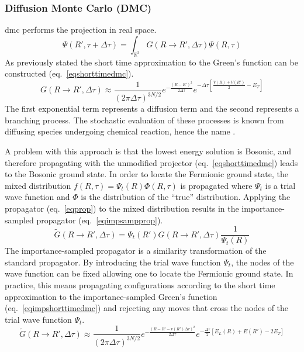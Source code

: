 \subsubsection{Diffusion Monte Carlo (DMC)}
\gls{dmc} performs the projection in real space.\cite{10.1016/bs.aiq.2015.07.003,10.1103/RevModPhys.73.33}
\begin{equation}
    \Psi(R',\tau + \Delta\tau) = \int_{\mathbb{R}^3} G(R \rightarrow R',\Delta \tau) \Psi(R,\tau)
\end{equation}
As previously stated the short time approximation to the Green's function can be constructed (eq.~\ref{eqshorttimedmc}).
\begin{equation}
    G(R \rightarrow R', \Delta \tau) \approx \frac{1}{(2\pi\Delta\tau)^{3N/2}} e^{-\frac{(R - R')^2 }{2\Delta\tau}} e^{-\Delta\tau[\frac{V(R) + V(R')}{2} - E_T]}
\label{eqshorttimedmc}
\end{equation}
The first exponential term represents a diffusion term and the second represents a branching process.
The stochastic evaluation of these processes is known from diffusing species undergoing chemical reaction, hence the name .

A problem with this approach is that the lowest energy solution is Bosonic, and therefore propagating with the unmodified projector (eq.~\ref{eqshorttimedmc}) leads to the Bosonic ground state.
In order to locate the Fermionic ground state, the mixed distribution $f(R,\tau) = \Psi_t(R)\Phi(R,\tau)$ is propagated where $\Psi_t$ is a trial wave function and $\Phi$ is the distribution of the ``true'' distribution.
Applying the propagator (eq.~\ref{eqprop}) to the mixed distribution results in the importance-sampled propagator (eq.~\ref{eqimpsampprop}). 
\begin{equation}
    \tilde{G}(R \rightarrow R', \Delta \tau)  = \Psi_t(R') G(R \rightarrow R', \Delta \tau) \frac{1}{\Psi_t(R)}
\label{eqimpsampprop}
\end{equation}
The importance-sampled propagator is a similarity transformation of the standard propagator.
By introducing the trial wave function $\Psi_t$, the nodes of the wave function can be fixed allowing one to locate the Fermionic ground state.
In practice, this means propagating configurations according to the short time approximation to the importance-sampled Green's function (eq.~\ref{eqimpshorttimedmc}) and rejecting any moves that cross the nodes of the trial wave function $\Psi_t$.
\begin{equation}
    \tilde{G}(R \rightarrow R', \Delta \tau) \approx \frac{1}{(2\pi\Delta\tau)^{3N/2}} e^{-\frac{(R - R' - v(R') \Delta \tau)^2 }{2\Delta\tau}} e^{-\frac{\Delta\tau}{2}[E_L(R) + E(R') - 2E_T]}
\label{eqimpshorttimedmc}
\end{equation}


